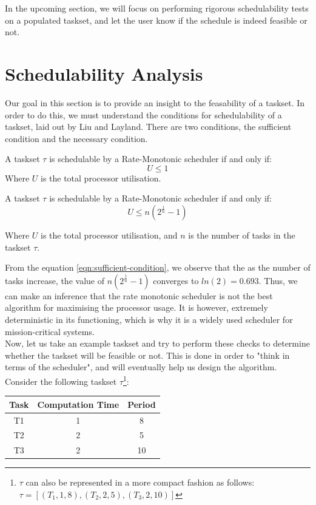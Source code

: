 In the upcoming section, we will focus on performing rigorous schedulability tests on a populated taskset, and let the user know if the schedule is indeed feasible or not.

\section{Schedulability Analysis}\label{sec:sched-analysis}

Our goal in this section is to provide an insight to the feasability of a taskset. In order to do this, we must understand the conditions for schedulability of a taskset, laid out by Liu and Layland\cite{liu-layland}. There are two conditions, the sufficient condition and the necessary condition.\\

\begin{tcolorbox}[title=Necessary Scheduling Condition]
A taskset $\tau$ is schedulable by a Rate-Monotonic scheduler if and only if:
\begin{equation}
  U \leq 1
\end{equation}
Where $U$ is the total processor utilisation.
\end{tcolorbox}

\begin{tcolorbox}[title=Sufficient Scheduling Condition]
A taskset $\tau$ is schedulable by a Rate-Monotonic scheduler if and only if:
\begin{equation}\label{eqn:sufficient-condition}
  U \leq n({2}^{\frac{1}{n}} - 1)
\end{equation}

Where $U$ is the total processor utilisation, and $n$ is the number of tasks in the taskset $\tau$.
\end{tcolorbox}

From the equation \ref{eqn:sufficient-condition}, we observe that the as the number of tasks increase, the value of $n({2}^{\frac{1}{n}} - 1)$ converges to $ln(2) = 0.693$. Thus, we can make an inference that the rate monotonic scheduler is not the best algorithm for maximising the processor usage. It is however, extremely deterministic in its functioning, which is why it is a widely used scheduler for mission-critical systems.\\

Now, let us take an example taskset and try to perform these checks to determine whether the taskset will be feasible or not. This is done in order to "think in terms of the scheduler", and will eventually help us design the algorithm. Consider the following taskset $\tau$\footnote{$\tau$ can also be represented in a more compact fashion as follows: $\tau = \left[(T_{1}, 1, 8), (T_{2}, 2, 5), (T_{3}, 2, 10) \right] $}:
\begin{center}
\begin{tabular}{|c|c|c|}
  \hline
  Task & Computation Time & Period \\
  \hline
  T1 & 1 & 8 \\
  \hline
  T2 & 2 & 5 \\
  \hline
  T3 & 2 & 10 \\
  \hline
\end{tabular}
\end{center}

